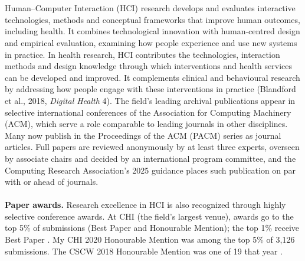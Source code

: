 \documentclass[11pt]{article}
\begin{document}





\ifAPR %
\sectionbreak
{}
\\ \\
Human–Computer Interaction (HCI) research develops and evaluates interactive technologies, methods and conceptual frameworks that improve human outcomes, including health. It combines technological innovation with human-centred design and empirical evaluation, examining how people experience and use new systems in practice. In health research, HCI contributes the technologies, interaction methods and design knowledge through which interventions and health services can be developed and improved. It complements clinical and behavioural research by addressing how people engage with these interventions in practice (Blandford et al., 2018, \emph{Digital Health} 4). The field's leading archival publications appear in selective international conferences of the Association for Computing Machinery (ACM), which serve a role comparable to leading journals in other disciplines. Many now publish in the Proceedings of the ACM (PACM) series as journal articles. Full papers are reviewed anonymously by at least three experts, overseen by associate chairs and decided by an international program committee, and the Computing Research Association's 2025 guidance places such publication on par with or ahead of journals. 
\\ \\
\textbf{Paper awards.} Research excellence in HCI is also recognized through highly selective conference awards. At CHI (the field's largest venue), awards go to the top 5\% of submissions (Best Paper and Honourable Mention); the top 1\% receive Best Paper . My CHI 2020 Honourable Mention was among the top 5\% of 3{,}126 submissions. The CSCW 2018 Honourable Mention was one of 19 that year .
\end{document}
